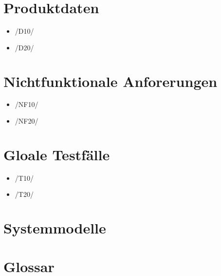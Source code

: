 \documentclass[a4paper]{scrreprt}
\begin{document}
\chapter{Produktdaten}
\begin{itemize}
\item /D10/ 
\item /D20/
\end{itemize}

\chapter{Nichtfunktionale Anforerungen}
\begin{itemize}
\item /NF10/ 
\item /NF20/

\end{itemize}


\chapter{Gloale Testfälle}
\begin{itemize}
\item /T10/ 
\item /T20/

\end{itemize}

\chapter{Systemmodelle}

\chapter{Glossar}
 

 
\end{document}
